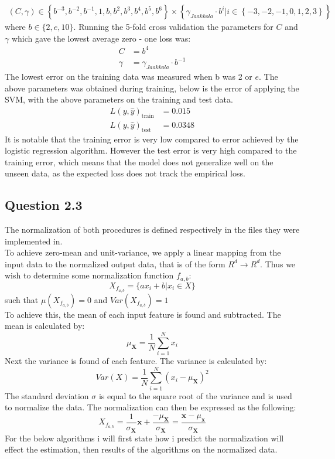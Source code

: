 \documentclass{article}
\begin{document}
\begin{align*}
(C,\gamma) \in \left\{ b^{-3}, b^{-2}, b^{-1}, 1, b, b^{2}, b^{3},b^4,b^5,b^6 \right\} \times \left\{ \gamma_{Jaakkola} \cdot b^{i} | i \in \left\{ -3, -2, -1, 0, 1, 2, 3 \right\} \right\}
\end{align*}
where $b \in \lbrace 2, e, 10 \rbrace$.
Running the 5-fold cross validation the parameters for $C$ and $\gamma$ which gave the lowest average zero - one loss was:
\begin{align*}
C &= b^4 \\
\gamma &= \gamma_{Jaakkola} \cdot b^{-1}
\end{align*}
The lowest error on the training data was measured when b was 2 or $e$. The above parameters was obtained during training, below is the error of applying the SVM, with the above parameters on the training and test data.
\begin{align*}
L(y,\hat{y})_{\text{train}} &= 0.015 \\
L(y,\hat{y})_{\text{test}} &= 0.0348
\end{align*}
It is notable that the training error is very low compared to error achieved by the logistic regression algorithm. However the test error is very high compared to the training error, which means that the model does not generalize well on the unseen data, as the expected loss does not track the empirical loss.
\subsection{Question 2.3}
The normalization of both procedures is defined respectively in the files they were implemented in. \\
To achieve zero-mean and unit-variance, we apply a linear mapping from the input data to the normalized output data, that is of the form $R^d \rightarrow R^d$. Thus we wish to determine some normalization function $ f_{a,b}$:
\begin{equation}
X_{f_{a,b}}  = \lbrace a x_i+b | x_i \in X \rbrace
\end{equation}
such that $\mu(X_{f_{a,b}})=0$ and $Var(X_{f_{a,b}})=1$ \\
To achieve this, the mean of each input feature is found and subtracted. The mean is calculated by:
\begin{equation*}
\mu_\mathbf{X} = \dfrac{1}{N} \sum\limits^{N}_{i=1}x_i
\end{equation*}
 Next the variance is found of each feature. The variance is calculated by:
\begin{equation*}
Var(X) = \dfrac{1}{N} \sum\limits^{N}_{i=1}(x_i - \mu_\mathbf{X})^2
\end{equation*}
The standard deviation $\sigma$ is equal to the square root of the variance and is used to normalize the data. The normalization can then be expressed as the following:
\begin{equation}
X_{f_{a,b}} = \dfrac{1}{\sigma_\mathbf{X}}\mathbf{x} + \dfrac{- \mu_\mathbf{X}}{\sigma_\mathbf{X}} = \dfrac{\mathbf{x} - \mu_\mathbf{x} }{\sigma_\mathbf{X}}
\label{norm}
\end{equation}
For the below algorithms i will first state how i predict the normalization will effect the estimation, then results of the algorithms on the normalized data.
\end{document}
